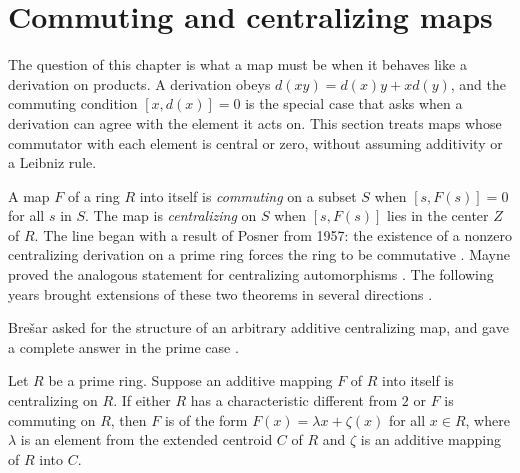\section{Commuting and centralizing maps}\label{sec:functional-identities:commuting-maps}

The question of this chapter is what a map must be when it behaves like a
derivation on products. A derivation obeys $d(xy)=d(x)y+xd(y)$, and the
commuting condition $[x,d(x)]=0$ is the special case that asks when a
derivation can agree with the element it acts on. This section treats maps
whose commutator with each element is central or zero, without assuming
additivity or a Leibniz rule.

A map $F$ of a ring $R$ into itself is \emph{commuting} on a subset $S$
\cite[p.~333]{LeeTK1997Centralizing} when $[s,F(s)]=0$ for all $s$ in $S$.
The map is \emph{centralizing} on $S$
\cite[p.~333]{LeeTK1997Centralizing} when $[s,F(s)]$ lies in the center
$Z$ of $R$.
The line began with a result of Posner from 1957: the existence of a
nonzero centralizing derivation on a prime ring forces the ring to be
commutative \cite[p.~385]{Bresar1993}. Mayne proved the
analogous statement for centralizing automorphisms
\cite[p.~385]{Bresar1993}. The
following years brought extensions of these two theorems in several
directions \cite[p.~385]{Bresar1993}.

Bre\v{s}ar asked for the structure of an arbitrary additive centralizing
map, and gave a complete answer in the prime case
\cite[p.~385]{Bresar1993}.

\begin{theorem}\label{thm:fi:bresarA}
Let $R$ be a prime ring. Suppose an additive mapping $F$ of $R$ into
itself is centralizing on $R$. If either $R$ has a characteristic
different from $2$ or $F$ is commuting on $R$, then $F$ is of the form
$F(x)=\lambda x+\zeta(x)$ for all $x\in R$, where $\lambda$ is an element
from the extended centroid $C$ of $R$ and $\zeta$ is an additive mapping
of $R$ into $C$.
\end{theorem}

